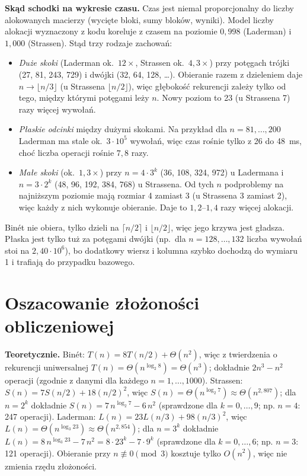 \documentclass[10pt,a4paper]{article}
\begin{document}
\textbf{Skąd schodki na wykresie czasu.} Czas jest niemal proporcjonalny do liczby alokowanych macierzy
(wycięte bloki, sumy bloków, wyniki). Model liczby alokacji wyznaczony z kodu koreluje z czasem na poziomie
$0{,}998$ (Laderman) i $1{,}000$ (Strassen). Stąd trzy rodzaje zachowań:
\begin{itemize}
\item \emph{Duże skoki} (Laderman ok.\ $12\times$, Strassen ok.\ $4{,}3\times$) przy potęgach trójki (27, 81, 243, 729)
i dwójki (32, 64, 128, \dots). Obieranie razem z dzieleniem daje $n\to\lfloor n/3\rfloor$ (u Strassena
$\lfloor n/2\rfloor$), więc głębokość rekurencji zależy tylko od tego, między którymi potęgami leży $n$.
Nowy poziom to 23 (u Strassena 7) razy więcej wywołań.
\item \emph{Płaskie odcinki} między dużymi skokami. Na przykład dla $n=81,\dots,200$ Laderman ma stale ok.\
$3\cdot10^{5}$ wywołań, więc czas rośnie tylko z 26 do 48~ms, choć liczba operacji rośnie $7{,}8$ razy.
\item \emph{Małe skoki} (ok.\ $1{,}3\times$) przy $n=4\cdot3^k$ (36, 108, 324, 972) u Ladermana i $n=3\cdot2^k$
(48, 96, 192, 384, 768) u Strassena. Od tych $n$ podproblemy na najniższym poziomie mają rozmiar 4 zamiast 3
(u Strassena 3 zamiast 2), więc każdy z nich wykonuje obieranie. Daje to $1{,}2$--$1{,}4$ razy więcej alokacji.
\end{itemize}
Binét nie obiera, tylko dzieli na $\lceil n/2\rceil$ i $\lfloor n/2\rfloor$, więc jego krzywa jest gładsza.
Płaska jest tylko tuż za potęgami dwójki (np.\ dla $n=128,\dots,132$ liczba wywołań stoi na $2{,}40\cdot10^{6}$),
bo dodatkowy wiersz i kolumna szybko dochodzą do wymiaru 1 i trafiają do przypadku bazowego.

\section{Oszacowanie złożoności obliczeniowej}
\textbf{Teoretycznie.} Binét: $T(n)=8T(n/2)+\Theta(n^2)$, więc z twierdzenia o rekurencji uniwersalnej
$T(n)=\Theta(n^{\log_2 8})=\Theta(n^3)$; dokładnie $2n^3-n^2$ operacji (zgodnie z danymi dla każdego
$n=1,\dots,1000$). Strassen: $S(n)=7S(n/2)+18(n/2)^2$, więc $S(n)=\Theta(n^{\log_2 7})\approx\Theta(n^{2{,}807})$;
dla $n=2^k$ dokładnie $S(n)=7\,n^{\log_2 7}-6\,n^2$ (sprawdzone dla $k=0,\dots,9$; np. $n=4$: 247 operacji).
Laderman: $L(n)=23L(n/3)+98(n/3)^2$, więc $L(n)=\Theta(n^{\log_3 23})\approx\Theta(n^{2{,}854})$; dla $n=3^k$
dokładnie $L(n)=8\,n^{\log_3 23}-7\,n^2=8\cdot23^k-7\cdot9^k$ (sprawdzone dla $k=0,\dots,6$; np. $n=3$: 121 operacji).
Obieranie przy $n\not\equiv0\pmod 3$ kosztuje tylko $O(n^2)$, więc nie zmienia rzędu złożoności.
\end{document}
